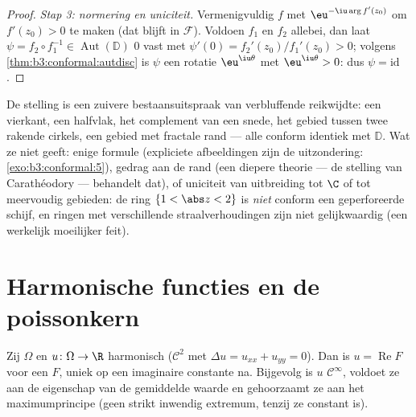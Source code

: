 \begin{proof}
\emph{Stap 3: normering en uniciteit.} Vermenigvuldig $f$ met
$\eu^{-\iu\arg f'(z_0)}$ om $f'(z_0) > 0$ te maken (dat blijft in
$\mathcal F$). Voldoen $f_1$ en $f_2$ allebei, dan laat $\psi =
f_2\circ f_1^{-1} \in \operatorname{Aut}(\mathbb D)$ $0$ vast met
$\psi'(0) = f_2'(z_0)/f_1'(z_0) > 0$; volgens
\cref{thm:b3:conformal:autdisc} is $\psi$ een rotatie
$\eu^{\iu\theta}$ met $\eu^{\iu\theta} > 0$: dus $\psi =
\mathrm{id}$.
\end{proof}

\begin{remark}\label{rem:b3:conformal:rmtscope}
De stelling is een zuivere bestaansuitspraak van verbluffende
reikwijdte: een vierkant, een halfvlak, het complement van een
snede, het gebied tussen twee rakende cirkels, een gebied met
fractale rand --- alle conform identiek met $\mathbb D$. Wat ze
niet geeft: enige formule (expliciete afbeeldingen zijn de
uitzondering: \cref{exo:b3:conformal:5}), gedrag aan de rand (een
diepere theorie --- de stelling van Carathéodory --- behandelt
dat), of uniciteit van uitbreiding tot $\C$ of tot meervoudig
 gebieden: de ring $\{1 < \abs z < 2\}$ is
\emph{niet} conform een geperforeerde schijf, en ringen met
verschillende straalverhoudingen zijn niet gelijkwaardig (een
werkelijk moeilijker feit).
\end{remark}

\section{Harmonische functies en de poissonkern}

\begin{proposition}\label{prop:b3:conformal:harmonicholo}
Zij $\Omega$  en $u \colon \Omega \to \R$
harmonisch ($\mathcal C^2$ met $\Delta
u = u_{xx} + u_{yy} = 0$). Dan is $u = \operatorname{Re}F$ voor
een  $F$, uniek op een imaginaire constante na.
Bijgevolg is $u$ $\mathcal C^\infty$, voldoet ze aan de
eigenschap van de gemiddelde waarde en gehoorzaamt ze aan het
maximumprincipe (geen strikt inwendig extremum, tenzij ze
constant is).
\end{proposition}

